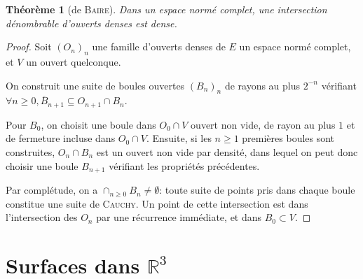 \documentclass[a4paper]{article}
\newcommand{\R}{\mathbb{R}}
\newcommand{\oB}{\overline{B}}
\newtheorem*{thm*}{Théorème}
\theoremstyle{definition}
\begin{document}
\begin{thm*}[de \textsc{Baire}]
	Dans un espace normé complet, une intersection dénombrable d'ouverts denses est dense.
\end{thm*}
\begin{proof}
	Soit $(O_n)_n$ une famille d'ouverts denses de $E$ un espace normé complet, et $V$ un ouvert quelconque.

	On construit une suite de boules ouvertes $(B_n)_n$ de rayons au plus $2^{-n}$ vérifiant $\forall n\geq0, \oB_{n+1} \subseteq O_{n+1}\cap B_n$.

	Pour $B_0$, on choisit une boule dans $O_0 \cap V$ ouvert non vide, de rayon au plus $1$ et de fermeture incluse dans $O_0 \cap V$.
	Ensuite, si les $n\geq1$ premières boules sont construites, $O_{n} \cap B_n$ est un ouvert non vide par densité, dans lequel on peut donc choisir une boule $B_{n+1}$ vérifiant les propriétés précédentes.

	Par complétude, on a $\cap_{n\geq0} B_n \neq \emptyset$: toute suite de points pris dans chaque boule constitue une suite de \textsc{Cauchy}.
	Un point de cette intersection est dans l'intersection des $O_n$ par une récurrence immédiate, et dans $B_0 \subset V$.
\end{proof}

\section{Surfaces dans $\R^3$}
\end{document}

